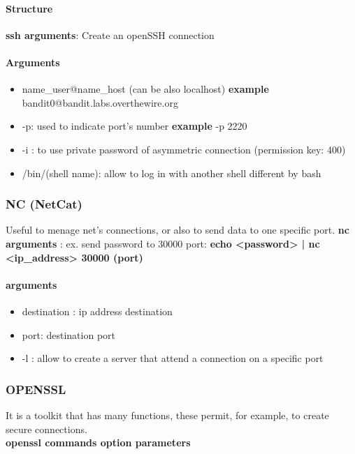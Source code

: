 \documentclass{article}
\begin{document}
                    \paragraph{Structure}
                    \textbf{ssh arguments}: Create an openSSH connection
                        \paragraph{Arguments}
                            \begin{itemize}
                                \item name\_user@name\_host (can be also localhost) \textbf{example} bandit0@bandit.labs.overthewire.org
                                \item -p: used to indicate port's number \textbf{example} -p 2220 
                                \item -i : to use private password of asymmetric connection (permission key: 400)
                                \item /bin/(shell name): allow to log in with another shell different by bash
                            \end{itemize}
                \subsubsection{NC (NetCat)}
                            Useful to menage net's connections, or also to send data to one specific port.
                            \textbf{nc arguments} : ex. send password to 30000 port: \textbf{echo <password> | nc <ip\_address> 30000 (port)}
                            \paragraph{arguments}
                            \begin{itemize}
                                \item destination : ip address destination
                                \item port: destination port
                                \item -l : allow to create a server that attend a connection on a specific port
                            \end{itemize}
                \subsubsection{OPENSSL}
                    It is a toolkit that has many functions, these permit, for example, to create secure connections. \\
                    \textbf{openssl commands option parameters}
\end{document}
